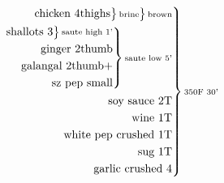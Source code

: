 \documentclass[12pt]{standalone}
\begin{document}
\[
\begin{rcases}\begin{alignedat}{3}
\begin{rcases}\begin{alignedat}{3}
\begin{rcases}\begin{alignedat}{3}
\text{chicken 4thighs}\\
\end{alignedat}\end{rcases}
\substack{\text{brine}}\\
\end{alignedat}\end{rcases}
\substack{\text{brown}}\\
\begin{rcases}\begin{alignedat}{3}
\begin{rcases}\begin{alignedat}{3}
\text{shallots 3}\\
\end{alignedat}\end{rcases}
\substack{\text{saute high 1'}}\\
\text{ginger 2thumb}\\
\text{galangal 2thumb+}\\
\text{sz pep small}\\
\end{alignedat}\end{rcases}
\substack{\text{saute low 5'}}\\
\text{soy sauce 2T}\\
\text{wine 1T}\\
\text{white pep crushed 1T}\\
\text{sug 1T}\\
\text{garlic crushed 4}\\
\end{alignedat}\end{rcases}
\substack{\text{350F 30'}}\\
\]
\end{document}
